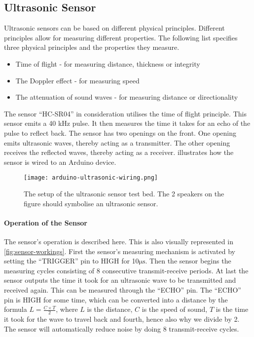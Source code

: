 \subsection{Ultrasonic Sensor}\label{sub:ultrasonic}

Ultrasonic sensors can be based on different physical principles. Different principles allow for measuring different properties. The following list specifies three physical principles and the properties they measure.

\begin{itemize}
  \item Time of flight - for measuring distance, thickness or integrity\cite{ultrasound2}
  \item The Doppler effect - for measuring speed\cite{ultrasound}
  \item The attenuation of sound waves - for measuring distance or directionality\cite{ultrasound}
\end{itemize}

The sensor \enquote{HC-SR04} in consideration utilises the time of flight principle. This sensor emits a 40 kHz pulse. It then measures the time it takes for an echo of the pulse to reflect back. The sensor has two openings on the front. One opening emits ultrasonic waves, thereby acting as a transmitter. The other opening receives the reflected waves, thereby acting as a receiver.  illustrates how the sensor is wired to an Arduino device.

\begin{figure}[htbp]
  \centering
  \texttt{[image: arduino-ultrasonic-wiring.png]}
  \caption[The setup of the ultrasonic sensor test bed]{The setup of the ultrasonic sensor test bed. The 2 speakers on the figure should symbolise an ultrasonic sensor.}\label{fig:ultrasonicwiring}
\end{figure}

\paragraph{Operation of the Sensor}
The sensor's operation is described here. This is also visually represented in \cref{fig:sensor-workings}. First the sensor's measuring mechanism is activated by setting the \enquote{TRIGGER} pin to HIGH for 10$\si{\micro\second}$. Then the sensor begins the measuring cycles consisting of 8 consecutive transmit-receive periods. At last the sensor outputs the time it took for an ultrasonic wave to be transmitted and received again. This can be measured through the \enquote{ECHO} pin. The \enquote{ECHO} pin is HIGH for some time, which can be converted into a distance by the formula $L = \frac{C \times T}{2}$, where $L$ is the distance, $C$ is the speed of sound, $T$ is the time it took for the wave to travel back and fourth, hence also why we divide by 2. The sensor will automatically reduce noise by doing 8 transmit-receive cycles.

